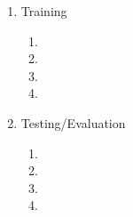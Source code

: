\documentclass[12pt,letterpaper]{article}
\theoremstyle{remark}
\theoremstyle{plain}
\begin{document}
\begin{enumerate}
\begin{enumerate}
\end{enumerate}
\item[] Training
\begin{enumerate}
\item[--] 
\item[--] 
\item[--] 
\item[--] 
\end{enumerate}
\item[] Testing/Evaluation
\begin{enumerate}
\item[--] 
\item[--] 
\item[--] 
\item[--] 
\end{enumerate}
\end{enumerate}
\end{document}
